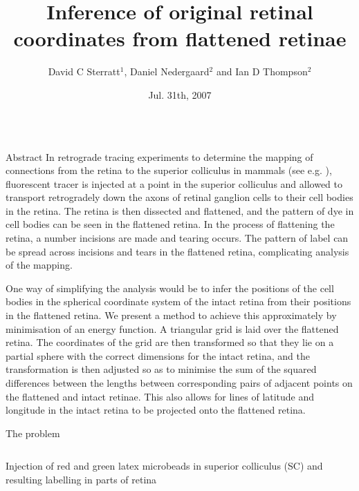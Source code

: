\documentclass[final,hyperref={pdfpagelabels=false}]{beamer}
\title{Inference of original retinal coordinates from flattened
  retinae} \author{David C Sterratt$^1$, Daniel Nedergaard$^2$ and Ian D Thompson$^2$}
\institute{$^1$Institute for Adaptive \& Neural Computation, School of
  Informatics, University of Edinburgh\\ $^2$MRC Centre for Developmental
  Neurobiology, King's College London} \date{Jul. 31th, 2007}
\begin{document}
\begin{frame}{} 
  \begin{columns}[T]

    \begin{column}{.33\linewidth}

      \begin{block}{Abstract}
        In retrograde tracing experiments to determine the mapping of
        connections from the retina to the superior colliculus in
        mammals (see e.g. \citealp{RashEtal05oppo}), fluorescent
        tracer is injected at a point in the superior colliculus and
        allowed to transport retrogradely down the axons of retinal
        ganglion cells to their cell bodies in the retina. The retina
        is then dissected and flattened, and the pattern of dye in
        cell bodies can be seen in the flattened retina. In the
        process of flattening the retina, a number incisions are made
        and tearing occurs. The pattern of label can be spread across
        incisions and tears in the flattened retina, complicating
        analysis of the mapping.

        One way of simplifying the analysis would be to infer the
        positions of the cell bodies in the spherical coordinate
        system of the intact retina from their positions in the
        flattened retina. We present a method to achieve this
        approximately by minimisation of an energy function. A
        triangular grid is laid over the flattened retina. The
        coordinates of the grid are then transformed so that they lie
        on a partial sphere with the correct dimensions for the intact
        retina, and the transformation is then adjusted so as to
        minimise the sum of the squared differences between the
        lengths between corresponding pairs of adjacent points on the
        flattened and intact retinae. This also allows for lines of
        latitude and longitude in the intact retina to be projected
        onto the flattened retina.
      \end{block}
      

      \begin{block}{The problem}

        \begin{columns}
          \begin{column}{0.25\linewidth}
            Injection of red and green latex microbeads in superior
            colliculus (SC) and resulting labelling in parts of retina


\end{column}
\end{columns}
\end{block}
\end{column}
\end{columns}
\end{frame}
\end{document}
